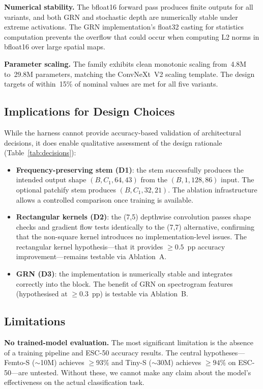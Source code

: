 \documentclass{article}
\begin{document}
\textbf{Numerical stability.} The bfloat16 forward pass produces finite outputs
for all variants, and both GRN and stochastic depth are numerically stable
under extreme activations. The GRN implementation's float32 casting for
statistics computation prevents the overflow that could occur when computing
L2 norms in bfloat16 over large spatial maps.

\textbf{Parameter scaling.} The family exhibits clean monotonic scaling from~4.8M
to~29.8M parameters, matching the ConvNeXt~V2 scaling template. The design
targets of within~15\% of nominal values are met for all five variants.

\subsection{Implications for Design Choices}

While the harness cannot provide accuracy-based validation of architectural
decisions, it does enable qualitative assessment of the design rationale
(Table~\ref{tab:decisions}):

\begin{itemize}
  \item \textbf{Frequency-preserving stem (D1)}: the stem successfully produces
  the intended output shape $(B, C_1, 64, 43)$ from the $(B, 1, 128, 86)$ input.
  The optional patchify stem produces $(B, C_1, 32, 21)$. The ablation
  infrastructure allows a controlled comparison once training is available.
  \item \textbf{Rectangular kernels (D2)}: the (7,5) depthwise convolution
  passes shape checks and gradient flow tests identically to the (7,7)
  alternative, confirming that the non-square kernel introduces no
  implementation-level issues. The rectangular kernel hypothesis---that it
  provides $\geq 0.5$~pp accuracy improvement---remains testable via Ablation~A.
  \item \textbf{GRN (D3)}: the implementation is numerically stable and
  integrates correctly into the block. The benefit of GRN on spectrogram
  features (hypothesised at $\geq 0.3$~pp) is testable via Ablation~B.
\end{itemize}

\subsection{Limitations}
\label{sec:limitations}

\textbf{No trained-model evaluation.} The most significant limitation is the
absence of a training pipeline and ESC-50 accuracy results. The central
hypotheses---Femto-S ($\sim$10M) achieves $\geq 93\%$ and Tiny-S ($\sim$30M)
achieves $\geq 94\%$ on ESC-50---are untested. Without these, we cannot make
any claim about the model's effectiveness on the actual classification task.
\end{document}
